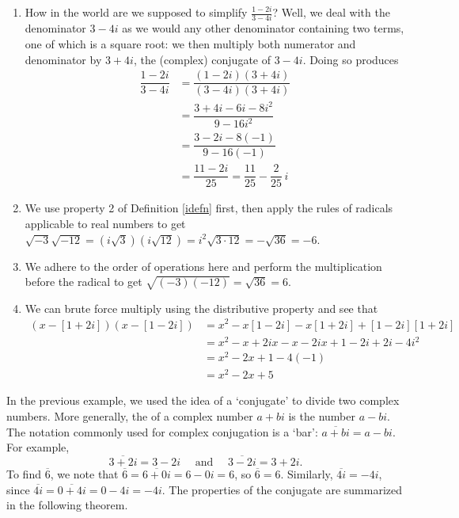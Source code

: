 {\begin{enumerate}
\item  How in the world are we supposed to simplify $\frac{1-2i}{3-4i}$?  Well, we deal with the denominator $3-4i$ as we would any other denominator containing two terms, one of which is a square root: we then multiply both numerator and denominator by $3+4i$, the (complex) conjugate of $3 - 4i$.  Doing so produces
\begin{align*}
 \dfrac{1-2i}{3-4i} & =  \dfrac{(1-2i)(3+4i)}{(3-4i)(3+4i)}  \tag*{Equivalent Fractions} \\[5pt]
                    & =    \dfrac{3 + 4i - 6i - 8i^2}{9 - 16i^2}  \tag*{F.O.I.L.}\\[5pt]
					& =  \dfrac{3 - 2i - 8(-1)}{9  - 16(-1)}  \tag*{$i^2 = -1$}\\[5pt]
					& =  \dfrac{11 - 2i}{25} =  \dfrac{11}{25} - \dfrac{2}{25} \, i 
\end{align*}
										

\item  We use property 2 of Definition \ref{idefn} first, then apply the rules of radicals applicable to real numbers to get $\sqrt{-3} \sqrt{-12} = \left(i \sqrt{3}\right) \left(i \sqrt{12}\right) = i^2 \sqrt{3\cdot 12} = -\sqrt{36} = -6$.

\item  We adhere to the order of operations here and perform the multiplication before the radical to get  $\sqrt{(-3)(-12)} = \sqrt{36} = 6$. 

\item  We can brute force multiply using the distributive property and see that 
\begin{align*}
(x-[1+2i])(x-[1-2i]) & =  x^2 -x[1-2i]-x[1+2i]+[1-2i][1+2i]  \\
					 & =  x^2-x+2ix-x-2ix+1-2i+2i-4i^2   \\
					 & =  x^2-2x + 1-4(-1) \\
					 & =  x^2 -2x +5 
\end{align*}
\end{enumerate}
\baselineskip}

\medskip



In the previous example, we used the idea of a `conjugate' to divide two complex numbers.   More generally, the  of a complex number $a+bi$ is the number $a-bi$.  The notation commonly used for complex conjugation is a `bar':  $\overline{a+bi} = a-bi$. For example, 
\[
\overline{3+2i} = 3-2i \quad \text{ and } \quad \overline{3-2i} = 3+2i.
\]
To find $\overline{6}$, we note that $\overline{6} = \overline{6+0i}= 6 - 0i = 6$, so $\overline{6} = 6$. Similarly, $\overline{4i} = -4i$, since $\overline{4i} = \overline{0 + 4i} = 0 - 4i =  -4i$.  The properties of the conjugate are summarized in the following theorem.

